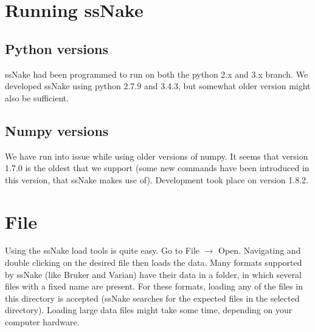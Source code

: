 \documentclass[11pt,a4paper]{article}
\renewcommand\cfttoctitlefont{\color{black!70}\Huge\fontfamily{SourceSansPro-LF}\bfseries}
\begin{document}


\thispagestyle{empty}
\newpage
\mbox{}


\renewcommand\cfttoctitlefont{\color{black}\Huge\fontfamily{SourceSansPro-LF}\bfseries}
\setcounter{tocdepth}{2}
\tableofcontents %

\renewcommand\cfttoctitlefont{\color{black!70}\Huge\fontfamily{SourceSansPro-LF}\bfseries}



\section{Running ssNake}
\subsection{Python versions}
ssNake had been programmed to run on both the python 2.x and 3.x branch. We developed ssNake using python 2.7.9 and 3.4.3, but somewhat older version might also be sufficient. 

\subsection{Numpy versions}
We have run into issue while using older versions of numpy. It seems that version 1.7.0 is the oldest that we support (some new commands have been introduced in this version, that ssNake makes use of). Development took place on version 1.8.2.



\section{File}
Using the ssNake load tools is quite easy. Go to File $\rightarrow$ Open. Navigating and double clicking on the desired file then loads the data. Many formats supported by ssNake (like Bruker and Varian) have their data in a folder, in which several files with a fixed name are present. For these formats, loading any of the files in this directory is accepted (ssNake searches for the expected files in the selected directory). Loading large data files might take some time, depending on your computer hardware.
\end{document}
